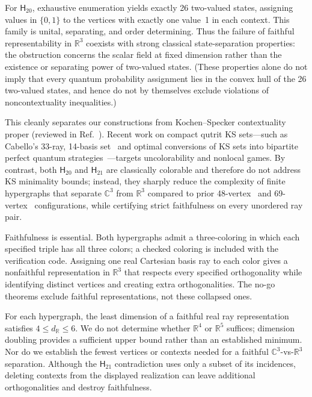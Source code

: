 \documentclass[twocolumn,aps,pra,floatfix,amsmath,amssymb,longbibliography]{revtex4-2}
\newenvironment{handrewrite}{\leavevmode\color{blue}}{}
\theoremstyle{definition}
\theoremstyle{remark}
\newcommand{\C}{\mathbb C}
\newcommand{\R}{\mathbb R}
\newcommand{\Htwenty}{\mathsf H_{20}}
\newcommand{\Htwentyone}{\mathsf H_{21}}
\begin{document}
For $\Htwenty$, exhaustive enumeration yields exactly 26 two-valued
states, assigning values in $\{0,1\}$ to the vertices with exactly one
value~1 in each context.  This family is unital, separating, and
order determining.  Thus the failure of faithful representability in
$\R^3$ coexists with strong classical state-separation properties:
the obstruction concerns the scalar field at fixed dimension rather
than the existence or separating power of two-valued states.  (These
properties alone do not imply that every quantum probability assignment
lies in the convex hull of the 26 two-valued states, and hence do not
by themselves exclude violations of noncontextuality inequalities.)

\begin{handrewrite}
This cleanly separates our constructions from Kochen--Specker contextuality
proper (reviewed in Ref.~\cite{cabello2021contextuality}).  Recent work on
compact qutrit KS sets---such as Cabello's 33-ray, 14-basis set~\cite{Cabello2025}
and optimal conversions of KS sets into bipartite perfect quantum
strategies~\cite{2024-cabello-trandafir0}---targets uncolorability and
nonlocal games.  By contrast, both $\Htwenty$ and $\Htwentyone$ are classically
colorable and therefore do not address KS minimality bounds; instead, they
sharply reduce the complexity of finite hypergraphs that separate $\C^3$ from
$\R^3$ compared to prior 48-vertex~\cite{harding2025remarksIJTP} and
69-vertex~\cite{svozil-2025-MYOCHS} configurations, while certifying strict
faithfulness on every unordered ray pair.
\end{handrewrite}

Faithfulness is essential.  Both hypergraphs admit a three-coloring
in which each specified triple has all three colors; a checked coloring
is included with the verification code.  Assigning one real Cartesian
basis ray to each color gives a nonfaithful representation in $\R^3$
that respects every specified orthogonality while identifying distinct
vertices and creating extra orthogonalities.  The no-go theorems exclude
faithful representations, not these collapsed ones.

For each hypergraph, the least dimension of a faithful real ray
representation satisfies $4\le d_{\R}\le6$.  We do not determine whether
$\R^4$ or $\R^5$ suffices; dimension doubling provides a sufficient
upper bound rather than an established minimum.  Nor do we establish the
fewest vertices or contexts needed for a faithful $\C^3$-vs-$\R^3$
separation.  Although the $\Htwentyone$ contradiction uses only a subset of
its incidences, deleting contexts from the displayed realization can leave
additional orthogonalities and destroy faithfulness.
\end{document}
